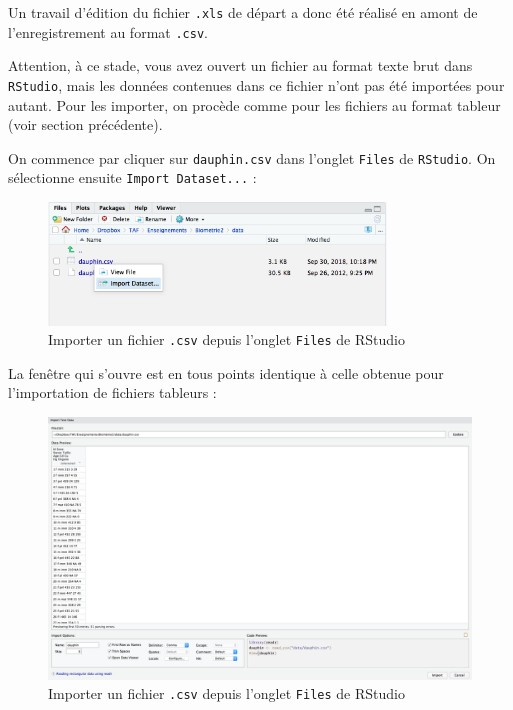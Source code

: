 \documentclass[
  letterpaper,
  DIV=11,
  numbers=noendperiod]{scrreprt}
\begin{document}
Un travail d'édition du fichier \texttt{.xls} de départ a donc été
réalisé en amont de l'enregistrement au format \texttt{.csv}.

Attention, à ce stade, vous avez ouvert un fichier au format texte brut
dans \texttt{RStudio}, mais les données contenues dans ce fichier n'ont
pas été importées pour autant. Pour les importer, on procède comme pour
les fichiers au format tableur (voir section précédente).

On commence par cliquer sur \texttt{dauphin.csv} dans l'onglet
\texttt{Files} de \texttt{RStudio}. On sélectionne ensuite
\texttt{Import\ Dataset...} :

\begin{figure}

{\centering \includegraphics[width=0.8\textwidth,height=\textheight]{./images/importcsv1.png}

}

\caption{Importer un fichier \texttt{.csv} depuis l'onglet
\texttt{Files} de RStudio}

\end{figure}

La fenêtre qui s'ouvre est en tous points identique à celle obtenue pour
l'importation de fichiers tableurs :

\begin{figure}

{\centering \includegraphics[width=1\textwidth,height=\textheight]{./images/importcsv2.png}

}

\caption{Importer un fichier \texttt{.csv} depuis l'onglet
\texttt{Files} de RStudio}

\end{figure}
\end{document}
